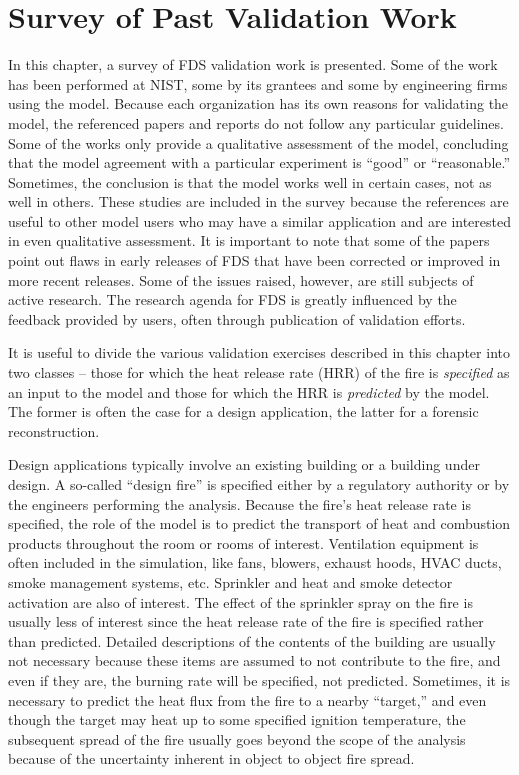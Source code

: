
\chapter{Survey of Past Validation Work}

\label{Survey_Chapter}

In this chapter, a survey of FDS validation work is presented. Some of the work has been performed at NIST, some by its grantees and some by engineering firms using the model. Because each organization has its own reasons for validating the model, the referenced papers and reports do not follow any particular guidelines. Some of the works only provide a qualitative assessment of the model, concluding that the model agreement with a particular experiment is ``good'' or ``reasonable.'' Sometimes, the conclusion is that the model works well in certain cases, not as well in others. These studies are included in the survey because the references are useful to other model users who may have a similar application and are interested in even qualitative assessment. It is important to note that some of the papers point out flaws in early releases of FDS that have been corrected or improved in more recent releases. Some of the issues raised, however, are still subjects of active research. The research agenda for FDS is greatly influenced by  the feedback provided by users, often through publication of validation efforts.

It is useful to divide the various validation exercises described in this chapter into two classes -- those for which the heat release rate (HRR) of the fire is {\em specified} as an input to the model and those for which the HRR
is {\em predicted} by the model. The former is often the case for a design application, the latter for a forensic reconstruction.

Design applications typically involve an existing building or a building under design. A so-called ``design fire'' is specified either by a regulatory authority or by the engineers performing the analysis. Because the fire's heat release rate is specified, the role of the model is to predict the transport of heat and combustion products throughout the room or rooms of interest. Ventilation equipment is often included in the simulation, like fans, blowers, exhaust hoods, HVAC ducts, smoke management systems, etc. Sprinkler and heat and smoke detector activation are also of interest. The effect of the sprinkler spray on the fire is usually less of interest since the heat release rate of the fire is specified rather than predicted. Detailed descriptions of the contents of the building are usually not necessary because these items are assumed to not contribute to the fire, and even if they are, the burning rate will be specified, not predicted. Sometimes, it is necessary to predict the heat flux from the fire to a nearby ``target,'' and even though the target may heat up to some specified ignition temperature, the subsequent spread of the fire usually goes beyond the scope of the analysis because of the uncertainty inherent in object to object fire spread.

